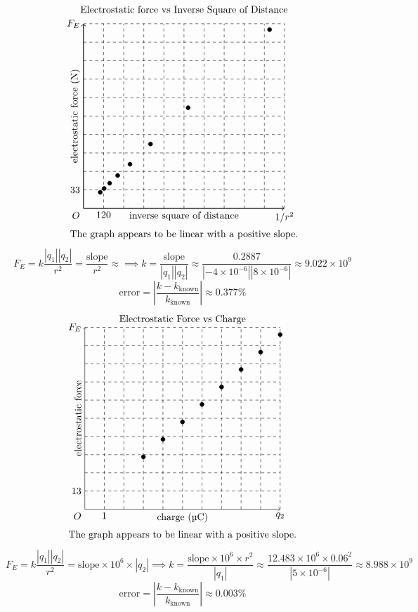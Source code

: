 \documentclass[A4, 12pt]{article}
\newcommand{\subt}[2]{#1_{\text{#2}}}
\begin{document}
	\[\begin{tikzpicture}[x = 0.06mm, y = 0.2mm]
		\node[above] at (600, 340) {Electrostatic force vs Inverse Square of Distance};
		\draw[thick, ->] (0, 0) node[anchor = north east]{\(O\)} -- (1200, 0) node[below]{\(1/r^2\)};
			\node[below] at (600, 0) {inverse square of distance};
		\draw[thick, ->] (0, 0) -- (0, 330) node[left]{\(F_E\)};
			\node[rotate = 90, above] at (0, 165) {electrostatic force (\SI{}{N})};
		\foreach \x in {1,..., 10}
			\draw[dashed] (0, \x * 33) -- (1200, \x * 33);
		\foreach \x in {1,..., 10}
			\draw[dashed] (\x * 120, 0) -- (\x * 120, 330);
		\node[below] at (120, 0) {120};
		\node[left] at (0, 33) {33};
		\foreach \x/\y in {100/28.78, 123.347/35.506, 156.25/44.938, 204.028/58.694, 277.78/78.889, 400/115.041, 625/179.751, 1111.1/319.557}
			\filldraw (\x, \y) circle (0.75mm);
		\node[below] at (600, -33) {The graph appears to be linear with a positive slope.};
	\end{tikzpicture}\]
	\[
		F_E = k\frac{|q_1||q_2|}{r^2} = 
				\frac{\text{slope}}{r^2} \approx 
			\implies k = \frac{\text{slope}}{|q_1||q_2|} 
				\approx \frac{0.2887}{|-4 \times 10^{-6}||8 \times 10^{-6}|} 
				\approx 9.022 \times 10^9
	\]
	\[\text{error} = \left|\frac{k - \subt{k}{known}}{\subt{k}{known}}\right| \approx 0.377 \%\]
	\[\begin{tikzpicture}[x = 7mm, y = 0.5mm]
		\node[above] at (5, 130) {Electrostatic Force vs Charge};
		\draw[->] (0, 0) node[anchor = north east]{\(O\)} -- (10, 0) node[below]{\(q_2\)};
			\node[below] at (5, 0) {charge (\SI{}{\micro C})};
		\draw[->] (0, 0) -- (0, 130) node[left]{\(F_E\)};
			\node[rotate = 90, above] at (0, 65) {electrostatic force};
		\foreach \x in {1,..., 10}
			\draw[dashed] (0, \x * 13) -- (10, \x * 13);
		\foreach \x in {1,..., 10}
			\draw[dashed] (\x, 0) -- (\x, 130);
		\node[below] at (1, 0) {1};
		\node[left] at (0, 13) {13};
		\foreach \x/\y in {10/124.827, 9/112.344, 8/99.862, 7/87.379, 6/74.896, 5/62.414, 4/49.931, 3/37.448}
			\filldraw (\x, \y) circle (0.75mm);
		\node[below] at (5, -13) {The graph appears to be linear with a positive slope.};
	\end{tikzpicture}\]
	\[
		F_E = k\frac{|q_1||q_2|}{r^2} 
				= \text{slope} \times 10^6 \times |q_2|
			\implies k = \frac{\text{slope} \times 10^6 \times r^2}{|q_1|} 
				\approx \frac{12.483 \times 10^6 \times 0.06^2}{|5 \times 10^{-6}|}
				\approx 8.988 \times 10^9
	\]
	\[\text{error} = \left|\frac{k - \subt{k}{known}}{\subt{k}{known}}\right| \approx 0.003 \%\]
\end{document}
